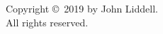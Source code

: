 \thispagestyle{empty}

\vspace*{\fill}

\begin{center}
  Copyright \copyright \ 2019 by John Liddell.\\
  \vspace{7mm}
  All rights reserved.\\
\end{center}

\vspace*{\fill}

\pagebreak
